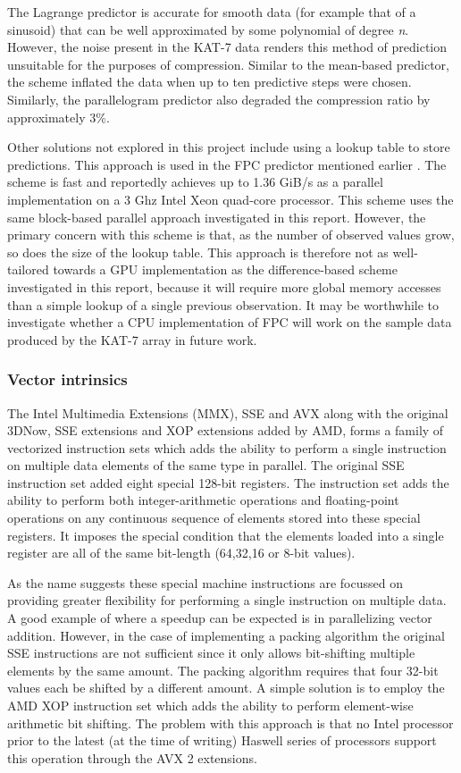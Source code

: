   The Lagrange predictor is accurate for smooth data (for example that of a sinusoid) that can be well approximated by some polynomial of degree \textit{n}. However, the noise present in the KAT-7 data renders this
  method of prediction unsuitable for the purposes of compression. Similar to the mean-based predictor, the scheme inflated the data when up to ten predictive steps were chosen. Similarly, the parallelogram predictor 
  also degraded the compression ratio by approximately 3\%.
  
  Other solutions not explored in this project include using a lookup table to store predictions. This approach is used in the FPC predictor mentioned earlier \cite{4589203}. The scheme is fast and reportedly achieves up to 
  1.36 GiB/s \cite{4976448} as a parallel implementation on a 3 Ghz Intel Xeon quad-core processor. This scheme uses the same block-based parallel approach investigated in this report. However, the primary concern with this 
  scheme is that, as the number of observed values grow, so does the size of the lookup table. This approach is therefore not as well-tailored towards a GPU implementation as the difference-based scheme investigated 
  in this report, because it will require more global memory accesses than a simple lookup of a single previous observation. It may be worthwhile to investigate whether a CPU implementation of FPC will work on the sample 
  data produced by the KAT-7 array in future work.
  \subsubsection{Vector intrinsics}
  The Intel Multimedia Extensions (MMX), SSE and AVX along with the original 3DNow, SSE extensions and XOP extensions added by AMD, forms a family of vectorized instruction sets which adds the ability to 
  perform a single instruction on multiple data elements of the same type in parallel. The original SSE instruction set added eight special 128-bit registers. The instruction set adds 
  the ability to perform both integer-arithmetic operations and floating-point operations on any continuous sequence of elements stored into these special registers. It imposes the special condition that the 
  elements loaded into a single register are all of the same bit-length (64,32,16 or 8-bit values).
  
  As the name suggests these special machine instructions are focussed on providing greater flexibility for performing a single instruction on multiple data. A good example of where
  a speedup can be expected is in parallelizing vector addition. However, in the case of implementing a packing algorithm the original SSE instructions are not sufficient since it only allows 
  bit-shifting multiple elements by the same amount. The packing algorithm requires that four 32-bit values each be shifted by a different amount. A simple solution is to employ the AMD XOP 
  instruction set which adds the ability to perform element-wise arithmetic bit shifting. The problem with this approach is that no Intel processor prior to the latest (at the time of writing) 
  Haswell series of processors support this operation through the AVX 2 extensions.
  
